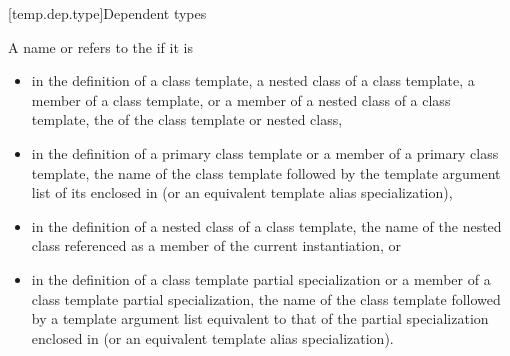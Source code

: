 [temp.dep.type]{Dependent types}

\pnum
A name or  refers to the
if it is
\begin{itemize}
\item
in the definition of a class template, a nested class of a class template,
a member of a class template, or a member of a nested class of a class template,
the  of the class template or nested class,
\item
in the definition of a primary class template
or a member of a primary class template, the name of the
class template followed by the template argument list of
its  enclosed in
\tcode{<>} (or an equivalent template alias specialization),
\item
in the definition of a nested class of a class template,
the name of the nested class referenced as a member of the
current instantiation, or
\item
in the definition of a class template partial specialization
or a member of a class template partial specialization, the name of
the class template followed by a template argument list
equivalent to that of the partial specialization
enclosed in \tcode{<>} (or an equivalent template alias specialization).
\end{itemize}

